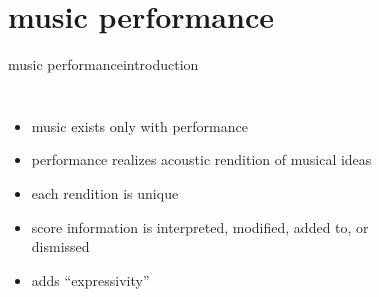     \section{music performance}
        \begin{frame}{music performance}{introduction}
            \vspace{-5mm}
            \begin{columns}
            \begin{itemize}
                \item	music exists only with performance
                \item   performance realizes acoustic rendition of musical ideas 
                \item   each rendition is unique
                \item   score information is interpreted, modified, added to, or dismissed
                \item   adds ``expressivity''
            \end{itemize}
            
                \begin{figure}
                   \scalebox{.5}{	}
                \end{figure}
            \end{columns}
            
            \bigskip
            \hspace{5mm}  

            \vspace{-30mm}
        \end{frame}
